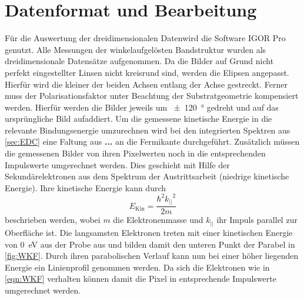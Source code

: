     \section{Datenformat und Bearbeitung}
        Für die Auswertung der dreidimensionalen Datenwird die Software IGOR Pro \cite{IGOR} genutzt.
        Alle Messungen der winkelaufgelösten Bandstruktur wurden als dreidimensionale Datensätze aufgenommen.
        Da die Bilder auf Grund nicht perfekt eingestellter Linsen nicht kreisrund sind, werden die Elipsen angepasst.
        Hierfür wird die kleiner der beiden Achsen entlang der Achse gestreckt.
        Ferner muss der Polarisationsfaktor unter Beachtung der Substratgeometrie kompensiert werden.
        Hierfür werden die Bilder jeweils um \SI{\pm120}{\degree} gedreht und auf das ursprüngliche Bild aufaddiert.
        Um die gemessene kinetische Energie in die relevante Bindungsenergie umzurechnen wird bei den integrierten Spektren aus \autoref{sec:EDC} eine Faltung aus \textbf{...} an die Fermikante durchgeführt.
        Zusätzlich müssen die gemessenen Bilder von ihren Pixelwerten noch in die entsprechenden Impulswerte umgerechnet werden.
        Dies geschieht mit Hilfe der Sekundärelektronen aus dem Spektrum der Austrittsarbeit (niedrige kinetische Energie).
        Ihre kinetische Energie kann durch 
        \begin{equation}
            E_\text{Kin} = \frac{\hbar^2 {k_{||}}^2}{2 m}
            \label{eqn:WKF}
        \end{equation}
        beschrieben werden, wobei $m$ die Elektronenmasse und $k_{||}$ ihr Impuls parallel zur Oberfläche ist.
        Die langsamsten Elektronen treten mit einer kinetischen Energie von \SI{0}{\electronvolt} aus der Probe aus und bilden damit den unteren Punkt der Parabel in \autoref{fig:WKF}.
        Durch ihren parabolischen Verlauf kann nun bei einer höher liegenden Energie ein Linienprofil genommen werden.
        Da sich die Elektronen wie in \autoref{eqn:WKF} verhalten können damit die Pixel in entsprechende Impulswerte umgerechnet werden.


